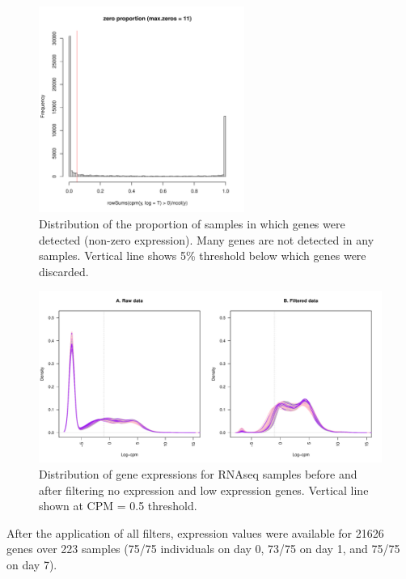 \begin{figure}
    \centering
    \includegraphics[width=0.6\textwidth, page=1]{mainmatter/figures/chapter_02/rnaseq_data_setup.gene_zero_prop.pdf}
    \caption{Distribution of the proportion of samples in which genes were detected (non-zero expression). Many genes are not detected in any samples. Vertical line shows 5\% threshold below which genes were discarded.}
    \label{fig:hird_rnaseq_filtering_zeroProp}
\end{figure}

\begin{figure}
    \includegraphics[width=1.0\textwidth]{mainmatter/figures/chapter_02/rnaseq_data_setup.sample_cpm_density_filtered.pdf}
    \caption{Distribution of gene expressions for \gls{RNAseq} samples before and after filtering no expression and low expression genes. Vertical line shown at \gls{CPM} = 0.5 threshold.}
    \label{fig:hird_rnaseq_cpm_filtering}
\end{figure}

After the application of all filters, expression values were available for 21626 genes over 223 samples (75/75 individuals on day 0, 73/75 on day 1, and 75/75 on day 7).

